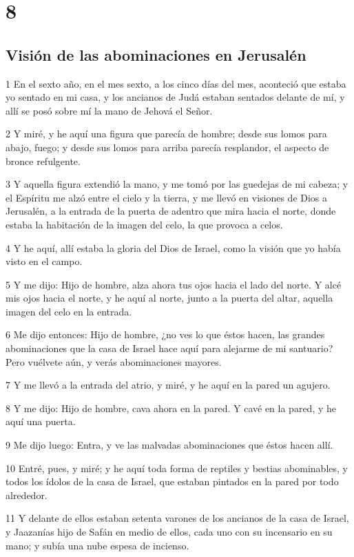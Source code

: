\chapter{8}

\section*{Visión de las abominaciones en Jerusalén}

\par 1 En el sexto año, en el mes sexto, a los cinco días del mes, aconteció que estaba yo sentado en mi casa, y los ancianos de Judá estaban sentados delante de mí, y allí se posó sobre mí la mano de Jehová el Señor.
\par 2 Y miré, y he aquí una figura que parecía de hombre; desde sus lomos para abajo, fuego; y desde sus lomos para arriba parecía resplandor, el aspecto de bronce refulgente. 
\par 3 Y aquella figura extendió la mano, y me tomó por las guedejas de mi cabeza; y el Espíritu me alzó entre el cielo y la tierra, y me llevó en visiones de Dios a Jerusalén, a la entrada de la puerta de adentro que mira hacia el norte, donde estaba la habitación de la imagen del celo, la que provoca a celos.
\par 4 Y he aquí, allí estaba la gloria del Dios de Israel, como la visión que yo había visto en el campo. 
\par 5 Y me dijo: Hijo de hombre, alza ahora tus ojos hacia el lado del norte. Y alcé mis ojos hacia el norte, y he aquí al norte, junto a la puerta del altar, aquella imagen del celo en la entrada.
\par 6 Me dijo entonces: Hijo de hombre, ¿no ves lo que éstos hacen, las grandes abominaciones que la casa de Israel hace aquí para alejarme de mi santuario? Pero vuélvete aún, y verás abominaciones mayores.
\par 7 Y me llevó a la entrada del atrio, y miré, y he aquí en la pared un agujero.
\par 8 Y me dijo: Hijo de hombre, cava ahora en la pared. Y cavé en la pared, y he aquí una puerta.
\par 9 Me dijo luego: Entra, y ve las malvadas abominaciones que éstos hacen allí.
\par 10 Entré, pues, y miré; y he aquí toda forma de reptiles y bestias abominables, y todos los ídolos de la casa de Israel, que estaban pintados en la pared por todo alrededor.
\par 11 Y delante de ellos estaban setenta varones de los ancianos de la casa de Israel, y Jaazanías hijo de Safán en medio de ellos, cada uno con su incensario en su mano; y subía una nube espesa de incienso.
